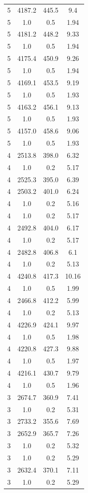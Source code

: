 \begin{table}[htbp]
\begin{tabular}{c c c c}
5 & 4187.2 & 445.5 & 9.4 \\
5 & 1.0 & 0.5 & 1.94 \\
5 & 4181.2 & 448.2 & 9.33 \\
5 & 1.0 & 0.5 & 1.94 \\
5 & 4175.4 & 450.9 & 9.26 \\
5 & 1.0 & 0.5 & 1.94 \\
5 & 4169.1 & 453.5 & 9.19 \\
5 & 1.0 & 0.5 & 1.93 \\
5 & 4163.2 & 456.1 & 9.13 \\
5 & 1.0 & 0.5 & 1.93 \\
5 & 4157.0 & 458.6 & 9.06 \\
5 & 1.0 & 0.5 & 1.93 \\
4 & 2513.8 & 398.0 & 6.32 \\
4 & 1.0 & 0.2 & 5.17 \\
4 & 2525.3 & 395.0 & 6.39 \\
4 & 2503.2 & 401.0 & 6.24 \\
4 & 1.0 & 0.2 & 5.16 \\
4 & 1.0 & 0.2 & 5.17 \\
4 & 2492.8 & 404.0 & 6.17 \\
4 & 1.0 & 0.2 & 5.17 \\
4 & 2482.8 & 406.8 & 6.1 \\
4 & 1.0 & 0.2 & 5.13 \\
4 & 4240.8 & 417.3 & 10.16 \\
4 & 1.0 & 0.5 & 1.99 \\
4 & 2466.8 & 412.2 & 5.99 \\
4 & 1.0 & 0.2 & 5.13 \\
4 & 4226.9 & 424.1 & 9.97 \\
4 & 1.0 & 0.5 & 1.98 \\
4 & 4220.8 & 427.3 & 9.88 \\
4 & 1.0 & 0.5 & 1.97 \\
4 & 4216.1 & 430.7 & 9.79 \\
4 & 1.0 & 0.5 & 1.96 \\
3 & 2674.7 & 360.9 & 7.41 \\
3 & 1.0 & 0.2 & 5.31 \\
3 & 2733.2 & 355.6 & 7.69 \\
3 & 2652.9 & 365.7 & 7.26 \\
3 & 1.0 & 0.2 & 5.32 \\
3 & 1.0 & 0.2 & 5.29 \\
3 & 2632.4 & 370.1 & 7.11 \\
3 & 1.0 & 0.2 & 5.29 \\

\end{tabular}
\end{table}
